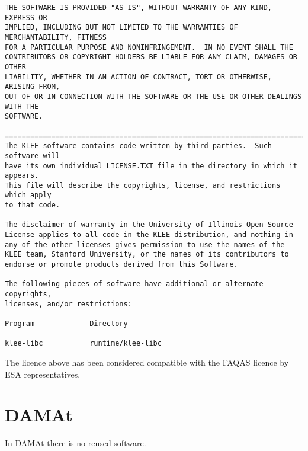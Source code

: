 \begin{lstlisting}[language={}]
THE SOFTWARE IS PROVIDED "AS IS", WITHOUT WARRANTY OF ANY KIND, EXPRESS OR
IMPLIED, INCLUDING BUT NOT LIMITED TO THE WARRANTIES OF MERCHANTABILITY, FITNESS
FOR A PARTICULAR PURPOSE AND NONINFRINGEMENT.  IN NO EVENT SHALL THE
CONTRIBUTORS OR COPYRIGHT HOLDERS BE LIABLE FOR ANY CLAIM, DAMAGES OR OTHER
LIABILITY, WHETHER IN AN ACTION OF CONTRACT, TORT OR OTHERWISE, ARISING FROM,
OUT OF OR IN CONNECTION WITH THE SOFTWARE OR THE USE OR OTHER DEALINGS WITH THE
SOFTWARE.

==============================================================================
The KLEE software contains code written by third parties.  Such software will
have its own individual LICENSE.TXT file in the directory in which it appears.
This file will describe the copyrights, license, and restrictions which apply
to that code.

The disclaimer of warranty in the University of Illinois Open Source
License applies to all code in the KLEE distribution, and nothing in
any of the other licenses gives permission to use the names of the
KLEE team, Stanford University, or the names of its contributors to
endorse or promote products derived from this Software.

The following pieces of software have additional or alternate copyrights,
licenses, and/or restrictions:

Program             Directory
-------             ---------
klee-libc           runtime/klee-libc
\end{lstlisting}

The licence above has been considered compatible with the FAQAS licence by ESA representatives.

\section{DAMAt}
\label{sec:damat:reuse}

In DAMAt there is no reused software.
